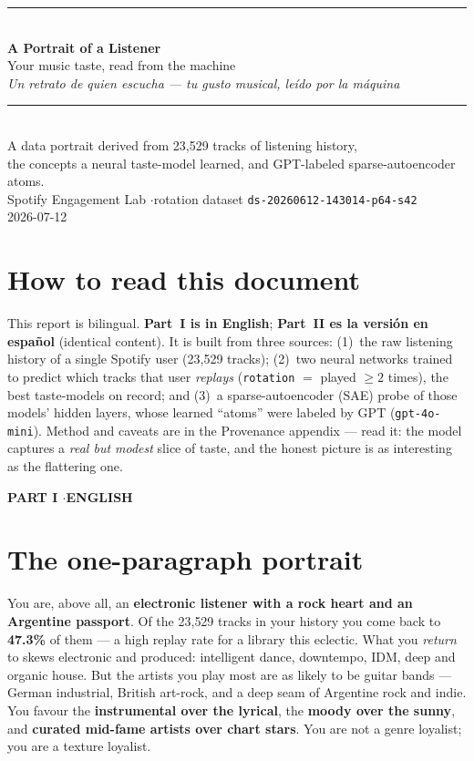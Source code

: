 \documentclass[11pt]{article}
\begin{document}
\begin{titlepage}
\centering
\vspace*{3cm}
{\color{accent}\rule{\textwidth}{2pt}}\\[0.8em]
{\Huge\bfseries A Portrait of a Listener}\\[0.4em]
{\Large Your music taste, read from the machine}\\[0.6em]
{\large\itshape Un retrato de quien escucha --- tu gusto musical, leído por la máquina}\\[0.8em]
{\color{accent}\rule{\textwidth}{2pt}}\\[2cm]
{\large A data portrait derived from 23{,}529 tracks of listening history,\\
the concepts a neural taste-model learned, and GPT-labeled sparse-autoencoder atoms.}\\[1cm]
{\normalsize Spotify Engagement Lab \quad$\cdot$\quad rotation dataset \texttt{ds-20260612-143014-p64-s42}}\\[0.3em]
{\normalsize 2026-07-12}
\vfill
\end{titlepage}

\section*{How to read this document}
This report is bilingual. \textbf{Part~I is in English}; \textbf{Part~II es la
versión en español} (identical content). It is built from three sources: (1)~the
raw listening history of a single Spotify user (23{,}529 tracks); (2)~two neural
networks trained to predict which tracks that user \emph{replays}
(\texttt{rotation} $=$ played $\geq 2$ times), the best taste-models on record;
and (3)~a sparse-autoencoder (SAE) probe of those models' hidden layers, whose
learned ``atoms'' were labeled by GPT (\texttt{gpt-4o-mini}). Method and caveats
are in the Provenance appendix --- read it: the model captures a \emph{real but
modest} slice of taste, and the honest picture is as interesting as the flattering
one.

\clearpage
\begin{center}{\color{blu}\Large\bfseries PART I \quad$\cdot$\quad ENGLISH}\end{center}
\vspace{0.5em}

\section{The one-paragraph portrait}
You are, above all, an \textbf{electronic listener with a rock heart and an
Argentine passport}. Of the 23{,}529 tracks in your history you come back to
\textbf{47.3\%} of them --- a high replay rate for a library this eclectic. What
you \emph{return} to skews electronic and produced: intelligent dance, downtempo,
IDM, deep and organic house. But the artists you play most are as likely to be
guitar bands --- German industrial, British art-rock, and a deep seam of Argentine
rock and indie. You favour the \textbf{instrumental over the lyrical}, the
\textbf{moody over the sunny}, and \textbf{curated mid-fame artists over chart
stars}. You are not a genre loyalist; you are a texture loyalist.
\end{document}
